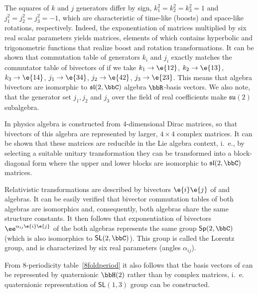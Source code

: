 \begin{example}
The squares of $k$ and $j$ generators differ by sign,
$k_1^2=k_2^2=k_3^2=1$ and $j_1^2=j_2^2=j_3^2=-1$, which are
characteristic of time-like (boosts) and space-like rotations,
respectively. Indeed, the exponentiation of matrices multiplied by
six real scalar parameters yields matrices, elements of which
contains hyperbolic and trigonometric functions that realize boost
and rotation transformations. It can be shown that commutation
table of generators $k_i$ and $j_i$ exactly matches the commutator
table of bivectors of  if we take $k_1\rightarrow\e{12}$,
$k_2\rightarrow\e{13}$, $k_3\rightarrow\e{14}$,
$j_1\rightarrow\e{34}$, $j_2\rightarrow\e{42}$,
$j_3\rightarrow\e{23}$. This means that  algebra
bivectors are isomorphic to $\mathfrak{sl}(2,\bbC)$ algebra
$\bbR$-basis vectors. We also note, that the generator set $j_1,
j_2$ and $j_3$ over the field of real coefficients make
$\mathfrak{su}(2)$ subalgebra.

In physics  algebra is constructed from 4-dimensional
Dirac matrices, so that bivectors of this algebra are represented
by larger, $4\times 4$ complex matrices. It can be shown that
these matrices are reducible in the Lie algebra context, i.~e., by
selecting a suitable unitary transformation they can be
transformed into a block-diagonal form where the upper and lower
blocks are isomorphic to $\mathfrak{sl}(2,\bbC)$ matrices.
\end{example}
%
\begin{example}
Relativistic transformations are described by bivectors $\e{i}\e{j}$ 
of  and  algebras. 
It can be easily verified that bivector commutation tables of both algebras are isomorphics and, consequently, both algebras share the same structure constants.
It then follows that exponentiation of bivectors $\ee^{\alpha_{ij}\e{i}\e{j}}$
of the both algebras represents the same group 
$\mathsf{Sp}(2,\bbC)$ (which is also isomorphics to
$\mathsf{SL}(2,\bbC)$). This group is called the Lorentz group, and is
characterized by six real parameters (angles $\alpha_{ij}$).

From $8$-periodicity table~\ref{8foldperiod} it also follows that
the basis vectors of  can be represented by quaternionic
$\bbH(2)$ rather than by complex matrices, i.~e. quaternionic representation of $\mathsf{SL}(1,3)$ group can be constructed.
\end{example}
%
